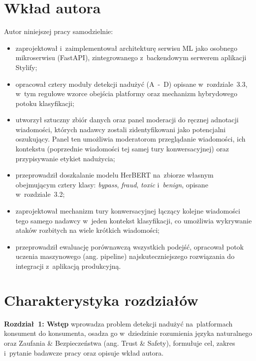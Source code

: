 \section{Wkład autora}
\label{sec:wklad}

Autor niniejszej pracy samodzielnie:

\begin{itemize}
  \item zaprojektował i~zaimplementował architekturę serwisu ML jako osobnego
    mikroserwisu (FastAPI), zintegrowanego z~backendowym serwerem
    aplikacji Stylify;
  \item opracował cztery moduły detekcji nadużyć (A~-~D) opisane w~rozdziale~3.3,
    w~tym regułowe wzorce obejścia platformy oraz mechanizm hybrydowego
    potoku klasyfikacji;
  \item utworzył sztuczny zbiór danych oraz panel moderacji do ręcznej adnotacji wiadomości, których nadawcy zostali zidentyfikowani jako potencjalni oszukujący. Panel ten umożliwia moderatorom przeglądanie wiadomości, ich kontekstu (poprzednie wiadomości tej samej tury konwersacyjnej) oraz przypisywanie etykiet nadużycia;
  \item przeprowadził doszkalanie modelu HerBERT \cite{bib:herbert}
    na~zbiorze własnym obejmującym cztery klasy: \textit{bypass}, \textit{fraud},
    \textit{toxic} i~\textit{benign}, opisane w~rozdziale~3.2;
  \item zaprojektował mechanizm tury konwersacyjnej łączący kolejne wiadomości
    tego samego nadawcy w~jeden kontekst klasyfikacji, co umożliwia wykrywanie
    ataków rozbitych na wiele krótkich wiadomości;
  \item przeprowadził ewaluację porównawczą wszystkich podejść, opracował potok uczenia maszynowego (ang. pipeline) najskuteczniejszego rozwiązania do integracji z~aplikacją produkcyjną.
\end{itemize}

\section{Charakterystyka rozdziałów}
\label{sec:charakterystyka}

\textbf{Rozdział~1: Wstęp} wprowadza problem detekcji nadużyć na~platformach
konsument do konsumenta, osadza go w~dziedzinie rozumienia języka naturalnego oraz Zaufania \& Bezpieczeństwa (ang. Trust \& Safety), formułuje cel,
zakres i~pytanie badawcze pracy oraz opisuje wkład autora.

